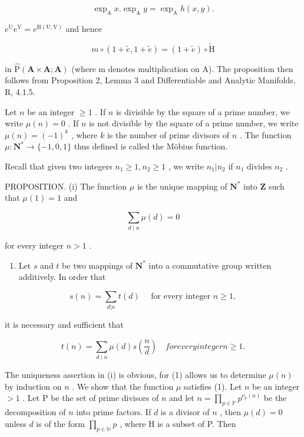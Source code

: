 \[
\exp_ {\mathrm{A}} x. \exp_ {\mathrm{A}} y = \exp_ {\mathrm{A}} h (x, y).\tag{26}
\]

\(e^{\mathrm{U}}e^{\mathrm{V}} = e^{\mathrm{H(U,V)}}\) and hence

\[
m \circ (1 + \tilde {e}, 1 + \tilde {e}) = (1 + \tilde {e}) \circ \tilde {\mathrm{H}}
\]

in \(\hat{\mathrm{P}}(\mathbf{A} \times \mathbf{A}; \mathbf{A})\) (where m denotes multiplication on A). The proposition then follows from Proposition 2, Lemma 3 and Differentiable and Analytic Manifolds, R, 4.1.5.



Let \(n\) be an integer \(\geqslant 1\) . If \(n\) is divisible by the square of a prime number, we write \(\mu(n) = 0\) . If \(n\) is not divisible by the square of a prime number, we write \(\mu(n) = (-1)^k\) , where \(k\) is the number of prime divisors of \(n\) . The function \(\mu: \mathbf{N}^* \to \{-1, 0, 1\}\) thus defined is called the Möbius function.

Recall that given two integers \(n_1 \geqslant 1, n_2 \geqslant 1\) , we write \(n_1|n_2\) if \(n_1\) divides \(n_2\) .

PROPOSITION. (i) The function \(\mu\) is the unique mapping of \(\mathbf{N}^*\) into \(\mathbf{Z}\) such that \(\mu(1) = 1\) and

\[
\sum_ {d \mid n} \mu (d) = 0\tag{1}
\]

for every integer \(n > 1\) .

\begin{enumerate}
\def\labelenumi{(\roman{enumi})}
\setcounter{enumi}{1}
\tightlist
\item
  Let \(s\) and \(t\) be two mappings of \(\mathbf{N}^*\) into a commutative group written additively. In order that
\end{enumerate}

\[
s (n) = \sum_ {d | n} t (d) \quad \text { for   every   integer } n \geqslant 1,\tag{2}
\]

it is necessary and sufficient that

\[
t (n) = \sum_ {d \mid n} \mu (d) s \left(\frac {n}{d}\right) \quad for every integer n \geqslant 1.\tag{3}
\]

The uniqueness assertion in (i) is obvious, for (1) allows us to determine \(\mu(n)\) by induction on \(n\) . We show that the function \(\mu\) satisfies (1). Let \(n\) be an integer \(>1\) . Let P be the set of prime divisors of \(n\) and let \(n = \prod_{p \in \mathbb{P}} p^{\nu_p(n)}\) be the decomposition of \(n\) into prime factors. If \(d\) is a divisor of \(n\) , then \(\mu(d) = 0\) unless \(d\) is of the form \(\prod_{p \in \mathbb{H}} p\) , where H is a subset of P. Then

